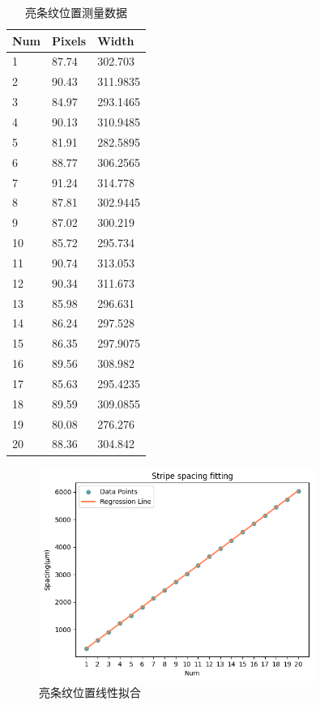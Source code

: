 \documentclass[UTF8]{ctexart}
\begin{document}
\begin{table}[htbp]
\centering
\caption{亮条纹位置测量数据}
\label{tab:fringe_position}
\begin{tabular}{|l|l|l|}
    \hline
    Num&Pixels&Width \\ \hline
    1&87.74&302.703 \\ \hline
    2&90.43&311.9835 \\ \hline
    3&84.97&293.1465 \\ \hline
    4&90.13&310.9485 \\ \hline
    5&81.91&282.5895 \\ \hline
    6&88.77&306.2565 \\ \hline
    7&91.24&314.778 \\ \hline
    8&87.81&302.9445 \\ \hline
    9&87.02&300.219 \\ \hline
    10&85.72&295.734 \\ \hline
    11&90.74&313.053 \\ \hline
    12&90.34&311.673 \\ \hline
    13&85.98&296.631 \\ \hline
    14&86.24&297.528 \\ \hline
    15&86.35&297.9075 \\ \hline
    16&89.56&308.982 \\ \hline
    17&85.63&295.4235 \\ \hline
    18&89.59&309.0855 \\ \hline
    19&80.08&276.276 \\ \hline
    20&88.36&304.842 \\ \hline
    \end{tabular}
\end{table}

\begin{figure}[htbp]
\centering
\includegraphics[width=0.8\textwidth]{fringe_fitting.png}
\caption{亮条纹位置线性拟合}
\label{fig:fringe_fitting}
\end{figure}
\end{document}
